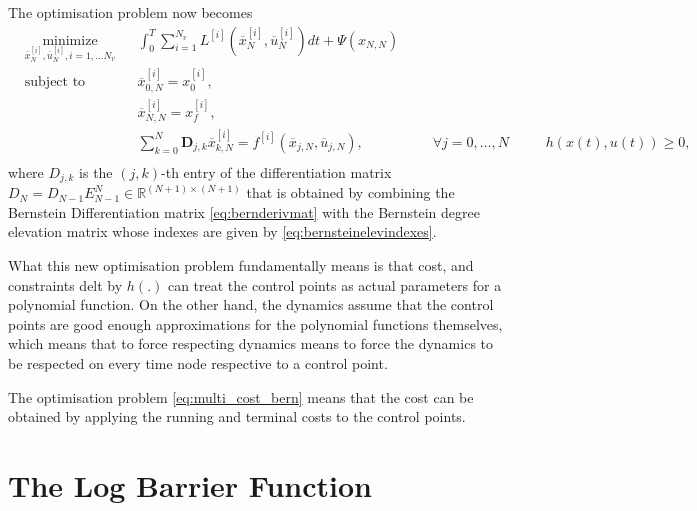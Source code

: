 \par The optimisation problem now becomes 
\begin{equation}
    \label{eq:multi_cost_bern}
    \begin{aligned}
    & \underset{\overline{x}_N^{[i]},\overline{u}_N^{[i]},i= 1,\dots N_v}{\text{minimize}} && \int_0^T \sum_{i=1}^{N_v}  L^{[i]} (\overline{x}_N^{[i]},\overline{u}_N^{[i]})dt + \Psi (x_{N,N}) \\
    & \text{subject to}  && \overline{x}^{[i]}_{0,N} = x_0^{[i]}, \\
        & && \overline{x}^{[i]}_{N,N} = x_f^{[i]}, \\
        & && \sum_{k=0}^{N} \boldsymbol{D}_{j,k} \overline{x}_{k,N}^{[i]} = f^{[i]} (\overline{x}_{j,N},\overline{u}_{j,N}), &&& \forall j=0,\dots,N\
        & && h(x(t),u(t)) \geq 0, \\
    \end{aligned}
\end{equation}
where $D_{j,k}$ is the $(j,k)$-th entry of the differentiation matrix $D_N = D_{N-1}E^N_{N-1}\in \mathbb{R}^{(N+1)\times(N+1)}$ that is obtained by combining the Bernstein Differentiation matrix \eqref{eq:bernderivmat} with the Bernstein degree elevation matrix whose indexes are given by \eqref{eq:bernsteinelevindexes}.
\par What this new optimisation problem fundamentally means is that cost, and constraints delt by $h(.)$ can treat the control points as actual parameters for a polynomial function. On the other hand, the dynamics assume that the control points are good enough approximations for the polynomial functions themselves, which means that to force respecting dynamics means to force the dynamics to be respected on every time node respective to a control point.
\par The optimisation problem \eqref{eq:multi_cost_bern} means that the cost can be obtained by applying the running and terminal costs to the control points.


\section{The Log Barrier Function}

